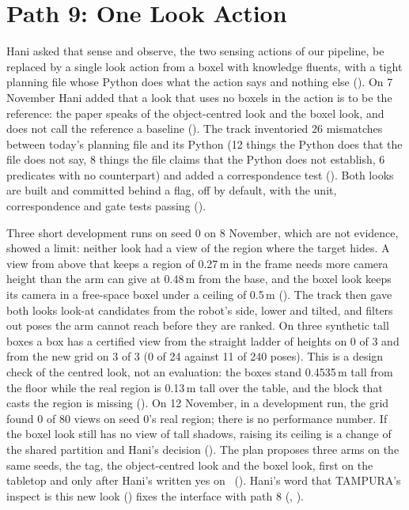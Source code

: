 \section{Path 9: One Look Action}
\label{sec:path9}

Hani asked that sense and observe, the two sensing actions of our pipeline, be
replaced by a single look action from a boxel with knowledge fluents, with a tight
planning file whose Python does what the action says and nothing else (). On 7
November Hani added that a look that uses no boxels in the action is to be the
reference: the paper speaks of the object-centred look and the boxel look, and does
not call the reference a baseline (). The track inventoried 26 mismatches
between today's planning file and its Python (12 things the Python does that the file
does not say, 8 things the file claims that the Python does not establish, 6
predicates with no counterpart) and added a correspondence test (). Both looks
are built and committed behind a flag, off by default, with the unit, correspondence
and gate tests passing ().

Three short development runs on seed 0 on 8 November, which are not evidence, showed a
limit: neither look had a view of the region where the target hides. A view from
above that keeps a region of 0.27\,m in the frame needs more camera height than the
arm can give at 0.48\,m from the base, and the boxel look keeps its camera in a
free-space boxel under a ceiling of 0.5\,m (). The track then gave both looks
look-at candidates from the robot's side, lower and tilted, and filters out poses the
arm cannot reach before they are ranked. On three synthetic tall boxes a box has a
certified view from the straight ladder of heights on 0 of 3 and from the new grid on
3 of 3 (0 of 24 against 11 of 240 poses). This is a design check of the centred look,
not an evaluation: the boxes stand 0.4535\,m tall from the floor while the real region
is 0.13\,m tall over the table, and the block that casts the region is missing
(). On 12 November, in a development run, the grid found 0 of 80 views on seed
0's real region; there is no performance number. If the boxel look still has
no view of tall shadows, raising its ceiling is a change of the shared partition and
Hani's decision (). The plan proposes three arms on the same seeds, the tag, the
object-centred look and the boxel look, first on the tabletop and only after Hani's
written yes on \fdice\ (). Hani's word that TAMPURA's inspect is this new look
() fixes the interface with path 8 (, ).

